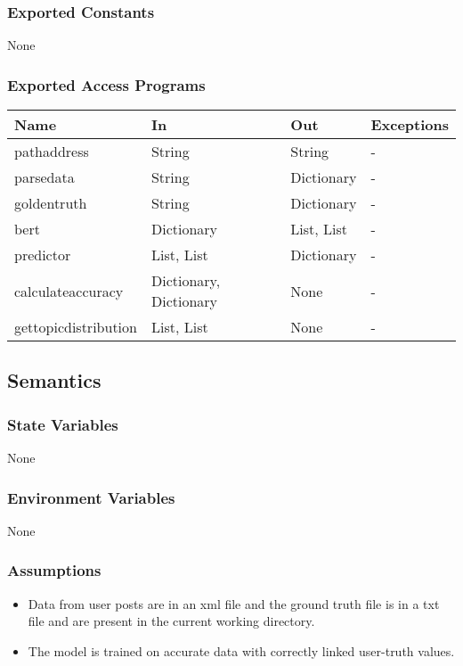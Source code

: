 \documentclass[12pt, titlepage]{article}
\begin{document}
\subsubsection{Exported Constants}

None

\subsubsection{Exported Access Programs}

\begin{center}
\begin{tabular}{p{3.5cm} p{4.5cm} p{3cm} p{2cm}}
\hline
\textbf{Name} & \textbf{In} & \textbf{Out} & \textbf{Exceptions} \\
\hline
pathaddress & String & String & - \\
parsedata & String & Dictionary & - \\
goldentruth & String & Dictionary & - \\
bert & Dictionary & List, List & - \\
predictor & List, List & Dictionary & - \\
calculateaccuracy & Dictionary, Dictionary & None & - \\
gettopicdistribution & List, List & None & - \\
\hline
\end{tabular}
\end{center}

\subsection{Semantics}

\subsubsection{State Variables}

None

\subsubsection{Environment Variables}

None

\subsubsection{Assumptions}

\begin{itemize}
\item Data from user posts are in an xml file and the ground truth file is in a txt file and are present in the current working directory.
\item The model is trained on accurate data with correctly linked user-truth values.
\end{itemize}
\end{document}
